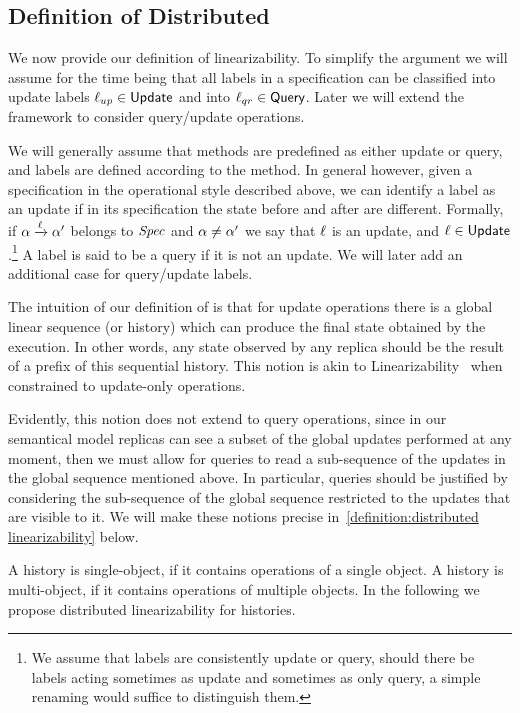 \subsection{Definition of Distributed \CRDTLin{}}
\label{subsec:definition of distributed linearizability}

We now provide our definition of linearizability.
To simplify the argument we will assume for the time being that all
labels in a specification can be classified into update labels
$\ell_{up} \in \mathsf{Update}$ and into $\ell_{qr} \in \mathsf{Query}$.
Later we will extend the framework to consider query/update
operations.

We will generally assume that methods are predefined as either update
or query, and labels are defined according to the method.
In general however, given a specification in the operational style
described above, we can identify a label as an update if in its
specification the state before and after are different.
Formally, if $\alpha \xrightarrow{\ell} \alpha'$ belongs to $\mathit{Spec}$
and $\alpha \neq \alpha'$ we say that $\ell$ is an update, and
$\ell \in \mathsf{Update}$.\footnote{We assume that labels are
  consistently update or query, should there be labels acting sometimes
  as update and sometimes as only query, a simple renaming would suffice
  to distinguish them.}
A label is said to be a query if it is not an update.
We will later add an additional case for query/update labels.

The intuition of our definition of \crdtlin{} is that for update
operations there is a global linear sequence (or history) which can
produce the final state obtained by the execution.
In other words, any state observed by any replica should be the result
of a prefix of this sequential history.
This notion is akin to Linearizability~\cite{HerlihyW90} when
constrained to update-only operations.

Evidently, this notion does not extend to query operations, since in
our semantical model replicas can see a subset of the global updates
performed at any moment, then we must allow for queries to read a
sub-sequence of the updates in the global sequence mentioned above.
In particular, queries should be justified by considering the
sub-sequence of the global sequence restricted to the updates that are
visible to it.
We will make these notions precise in~\autoref{definition:distributed
  linearizability} below.


 {A history is
  single-object, if it contains operations of a single object.
  A history is multi-object, if it contains operations of multiple
  objects.}
In the following we propose distributed linearizability for histories.

